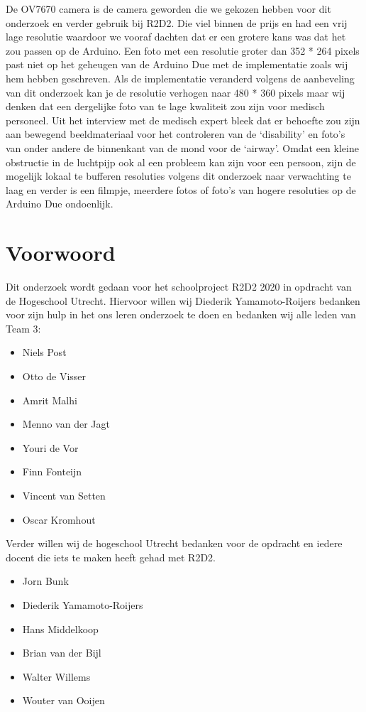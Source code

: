 \documentclass{article}
\begin{document}
De OV7670 camera is de camera geworden die we gekozen hebben voor dit onderzoek en verder gebruik bij R2D2. Die viel binnen de prijs en had een vrij lage resolutie waardoor we vooraf dachten dat er een grotere kans was dat het zou passen op de Arduino. 
Een foto met een resolutie groter dan 352 * 264 pixels past niet op het geheugen van de Arduino Due met de implementatie zoals wij hem hebben geschreven. Als de implementatie veranderd volgens de aanbeveling van dit onderzoek kan je de resolutie verhogen naar 480 * 360 pixels maar wij denken dat een dergelijke foto van te lage kwaliteit zou zijn voor medisch personeel. 
Uit het interview met de medisch expert bleek dat er behoefte zou zijn aan bewegend beeldmateriaal voor het controleren van de ‘disability’ en foto’s van onder andere de binnenkant van de mond voor de ‘airway’. Omdat een kleine obstructie in de luchtpijp ook al een probleem kan zijn voor een persoon, zijn de mogelijk lokaal te bufferen resoluties volgens dit onderzoek naar verwachting te laag en verder is een filmpje, meerdere fotos of foto’s van hogere resoluties op de Arduino Due ondoenlijk. 

\section{Voorwoord}
Dit onderzoek wordt gedaan voor het schoolproject R2D2 2020 in opdracht van de Hogeschool Utrecht. Hiervoor willen wij Diederik Yamamoto-Roijers bedanken voor zijn hulp in het ons leren onderzoek te doen en bedanken wij alle leden van Team 3: \begin{itemize}
	\item Niels Post
	\item Otto de Visser
	\item Amrit Malhi
	\item Menno van der Jagt
	\item Youri de Vor
	\item Finn Fonteijn
	\item Vincent van Setten
	\item Oscar Kromhout
\end{itemize}

Verder willen wij de hogeschool Utrecht bedanken voor de opdracht en iedere docent die iets te maken heeft gehad met R2D2.

\begin{itemize}
	\item Jorn Bunk
	\item Diederik Yamamoto-Roijers
	\item Hans Middelkoop
	\item Brian van der Bijl
	\item Walter Willems
	\item Wouter van Ooijen
\end{itemize}
\end{document}
